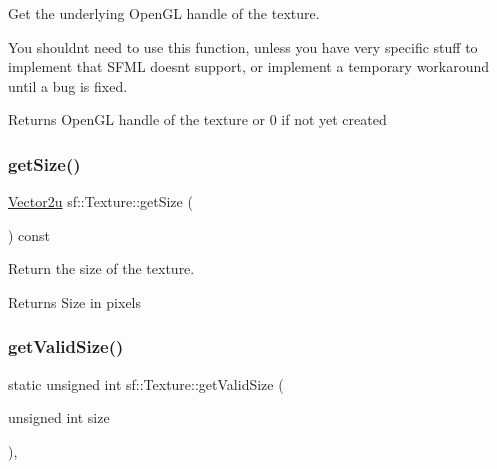 Get the underlying Open\+GL handle of the texture. 

You shouldn\textquotesingle{}t need to use this function, unless you have very specific stuff to implement that S\+F\+ML doesn\textquotesingle{}t support, or implement a temporary workaround until a bug is fixed.

\begin{DoxyReturn}{Returns}
Open\+GL handle of the texture or 0 if not yet created \begin{DoxyVerb}\end{DoxyVerb}
 
\end{DoxyReturn}
\mbox{\label{classsf_1_1_texture_a9f86b8cc670c6399c539d4ce07ae5c8a}} 
\subsubsection{\texorpdfstring{getSize()}{getSize()}}
{\footnotesize\ttfamily \mbox{\hyperlink{classsf_1_1_vector2}{Vector2u}} sf\+::\+Texture\+::get\+Size (\begin{DoxyParamCaption}{ }\end{DoxyParamCaption}) const}



Return the size of the texture. 

\begin{DoxyReturn}{Returns}
Size in pixels \begin{DoxyVerb}\end{DoxyVerb}
 
\end{DoxyReturn}
\mbox{\label{classsf_1_1_texture_a8a2aea2ef4e24f5f8eb25374631a1802}} 
\subsubsection{\texorpdfstring{getValidSize()}{getValidSize()}}
{\footnotesize\ttfamily static unsigned int sf\+::\+Texture\+::get\+Valid\+Size (\begin{DoxyParamCaption}\item[{unsigned int}]{size }\end{DoxyParamCaption})\hspace{0.3cm}{\ttfamily [static]}, {\ttfamily [private]}}



